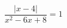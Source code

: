 \begin{ex}[type=equation]
	\begin{condition}
		$\dfrac{\big|x - 4\big|}{x^2 - 6x + 8}= 1$
	\end{condition}
	\answer{$\left\{ 1 \right\}$}
\end{ex}